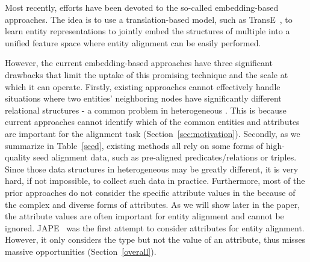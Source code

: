 	Most recently, efforts have been devoted to the so-called \KG embedding-based approaches. The idea is to use a translation-based model,
such as TransE~\cite{bordes2013translating}, to learn entity representations to jointly embed the structures of multiple \KGs into a
unified feature space where entity alignment can be easily performed. %

However, the current \KG embedding-based approaches have three significant drawbacks that limit the uptake of this promising technique and
the scale at which it can operate. Firstly, existing approaches cannot effectively handle situations where two entities' neighboring nodes
have significantly different relational structures - a common problem in heterogeneous \KGs. This is because current approaches cannot
identify which of the common entities and attributes are important for the alignment task (Section~\ref{sec:motivation}). Secondly, as we
summarize in Table~\ref{seed}, existing methods all rely on some forms of high-quality seed alignment data, such as pre-aligned \KG
predicates/relations or triples. Since those data structures in heterogeneous \KGs may be greatly different, it is very hard, if not
impossible, to collect such data in practice. Furthermore, most of the prior approaches do not consider the specific attribute values in
the \KGs because of the complex and diverse forms of attributes. As we will show later in the paper, the attribute values are often
important for entity alignment and cannot be ignored. JAPE~\cite{sun2017cross} was the first attempt to consider attributes for entity
alignment. However, it only considers the type but not the value of an attribute, thus misses massive opportunities
(Section~\ref{overall}).


